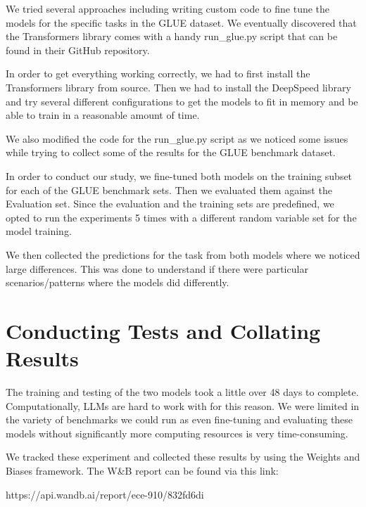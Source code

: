 \documentclass[\main/thesis.tex]{subfiles}
\begin{document}
We tried several approaches including writing custom code to fine tune the models for 
the specific tasks in the GLUE dataset. We eventually discovered that the Transformers library 
comes with a handy run\_glue.py script that can be found in their GitHub repository.

In order to get everything working correctly, we had to first install the Transformers library 
from source. Then we had to install the DeepSpeed library and try several different configurations 
to get the models to fit in memory and be able to train in a reasonable amount of time. 


We also modified the code for the run\_glue.py script as we noticed some issues while trying to collect
some of the results for the GLUE benchmark dataset. 


In order to conduct our study, we fine-tuned both models on the training subset for each of the GLUE 
benchmark sets. Then we evaluated them against the Evaluation set. Since the evaluation and the 
training sets are predefined, we opted to run the experiments 5 times with a different random variable set 
for the model training. 

We then collected the predictions for the task from both models where we noticed 
large differences. This was done to understand if there were particular scenarios/patterns where the 
models did differently. 

\section{Conducting Tests and Collating Results}

The training and testing of the two models took a little over 48 days to complete. Computationally, 
LLMs are hard to work with for this reason. We were limited in the variety of benchmarks we could run
as even fine-tuning and evaluating these models without significantly more computing resources is very 
time-consuming. 

We tracked these experiment and collected these results by using the Weights and Biases framework. The 
W\&B report can be found via this link: 

https://api.wandb.ai/report/ece-910/832fd6di
\end{document}
